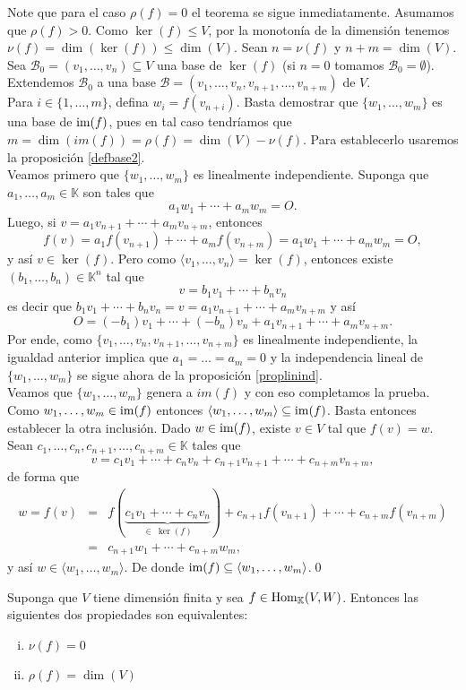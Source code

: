 \dem Note que para el caso $\rho(f)=0$ el teorema se sigue inmediatamente. Asumamos que $\rho(f)>0$. Como $\ker(f)\le V$, por la monoton\'ia de la dimensi\'on tenemos $\nu(f)=\dim\left(\ker(f)\right)\le\dim(V)$. Sean $n=\nu(f)$ y $n+m=\dim (V)$. Sea $\mathcal{B}_0=(v_1,\ldots,v_n)\subseteq V$ una base de $\ker(f)$ (si $n=0$ tomamos $\mathcal{B}_0=\emptyset$). Extendemos $\mathcal{B}_0$ a una base $\mathcal{B}=(v_1,\ldots,v_n,v_{n+1},\ldots,v_{n+m})$ de $V$.\\
Para $i\in\{1,\ldots,m\}$, defina $w_i=f(v_{n+i})$. Basta demostrar que $\{w_1,\ldots,w_m\}$ es una base de $\operatorname{im}(f)$, pues en tal caso tendr\'iamos que $m=\dim\left(im(f)\right)=\rho(f)=\dim (V)-\nu(f)$. Para establecerlo usaremos la proposici\'on \ref{defbase2}.\\
Veamos primero que $\{w_1,\ldots,w_m\}$ es linealmente independiente. Suponga que $a_1,\ldots,a_m\in \mathbb{K}$ son tales que
\[
a_1w_1+\cdots+a_mw_m=O.
\]
Luego, si $v=a_1v_{n+1}+\cdots+a_mv_{n+m}$, entonces
\[
f(v)=a_1f(v_{n+1})+\cdots+a_mf(v_{n+m})=a_1w_1+\cdots+a_mw_m=O,
\]
y as\'i $v\in\ker(f)$. Pero como $\langle v_1,\ldots,v_n\rangle=\ker(f)$, entonces existe $(b_1,\ldots,b_n)\in \mathbb{K}^n$ tal que
\[
v=b_1v_1+\cdots+b_nv_n
\]
es decir que $b_1v_1+\cdots+b_nv_n=v=a_1v_{n+1}+\cdots+a_mv_{n+m}$ y as\'i
\[
O=(-b_1)v_1+\cdots+(-b_n)v_n+a_1v_{n+1}+\cdots+a_mv_{n+m}.
\]
Por ende, como $\{v_1,\ldots,v_n,v_{n+1},\ldots,v_{n+m}\}$ es linealmente independiente, la igualdad anterior implica que $a_1=\ldots=a_m=0$ y la independencia lineal de $\{w_1,\ldots,w_m\}$ se sigue ahora de la  proposici\'on \ref{proplinind}.\\
Veamos que  $\{w_1,\ldots,w_m\}$ genera a $im(f)$ y con eso completamos la prueba. Como $w_1,\ldots,w_m\in \operatorname{im}(f)$ entonces $\langle w_1,\ldots,w_m\rangle\subseteq\operatorname{im}(f)$. Basta entonces establecer la otra inclusi\'on. Dado $w\in\operatorname{im}(f)$, existe $v\in V$ tal que $f(v)=w$. Sean $c_1,\ldots,c_n,c_{n+1},\ldots,c_{n+m}\in \mathbb{K}$ tales que 
\[
v=c_1v_1+\cdots+c_nv_n+c_{n+1}v_{n+1}+\cdots+c_{n+m}v_{n+m},
\]
de forma que
\begin{eqnarray*}
w=f(v) & = & f(\underbrace{c_1v_1+\cdots+c_nv_n}_{\in\ \ker(f)})+c_{n+1}f(v_{n+1})+\cdots+c_{n+m}f(v_{n+m})\\
           & = & c_{n+1}w_1+\cdots+c_{n+m}w_m,
\end{eqnarray*}
y as\'i $w\in\langle w_1,\ldots,w_m\rangle$. De donde $\operatorname{im}(f)\subseteq\langle w_1,\ldots,w_m\rangle$.\qed

\begin{coro}\label{corteorango}
Suponga que $V$ tiene dimensi\'on finita y sea $f\in\operatorname{Hom}_{\mathbb{K}}(V,W)$. Entonces las siguientes dos propiedades son equivalentes:
\begin{enumerate}[(i)]
\item $\nu(f)=0$
\item $\rho(f)=\dim(V)$
\end{enumerate}
\end{coro}

